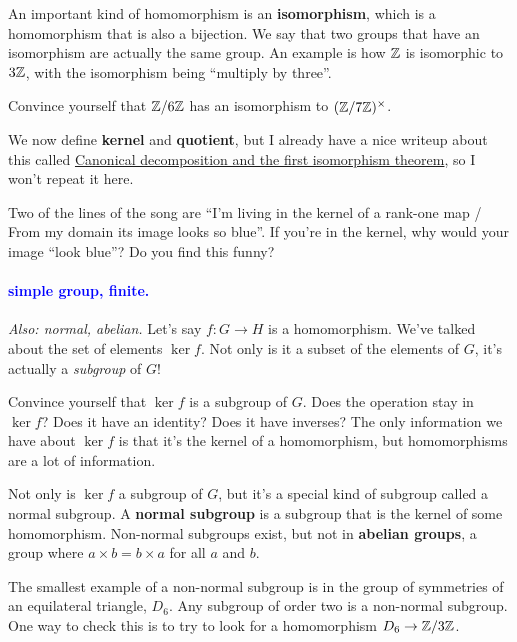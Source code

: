 \documentclass[11pt,paper=letter]{scrartcl}
\renewcommand{\bluebf}[1]{{\bfseries \color{Blue} #1}}
\renewcommand\wp[1]{\paragraph{\textcolor{Blue}{#1.}} \hspace{-1em}}
\newcommand\wl[1]{\label{w:#1}}
\newcommand\oww[1]{\textit{Also: #1.}}
\begin{document}
An important kind of homomorphism is an \textbf{isomorphism}, which is a homomorphism that is also a bijection. We say that two groups that have an isomorphism are actually the same group. An example is how $\mathbb Z$ is isomorphic to $3\mathbb Z$, with the isomorphism being ``multiply by three''.

\begin{exrboxed}
  Convince yourself that $\mathbb Z/6\mathbb Z$ has an isomorphism to $(\mathbb Z/7\mathbb Z)^\times$.
\end{exrboxed}

We now define \bluebf{kernel} and \bluebf{quotient}, but I already have a nice writeup about this called \href{https://cjquines.com/files/canonicaldecomposition.pdf}{Canonical decomposition and the first isomorphism theorem}, so I won't repeat it here.

\begin{exrboxed}
  Two of the lines of the song are ``I'm living in the kernel of a rank-one map / From my domain its image looks so blue''. If you're in the kernel, why would your image ``look blue''? Do you find this funny?
\end{exrboxed}

\wp{simple group, finite}
\wl{simple group}
\wl{finite}
\oww{normal, abelian}
Let's say $f : G \to H$ is a homomorphism. We've talked about the set of elements $\ker f$. Not only is it a subset of the elements of $G$, it's actually a \textit{subgroup} of $G$!

\begin{exrboxed}
  Convince yourself that $\ker f$ is a subgroup of $G$. Does the operation stay in $\ker f$? Does it have an identity? Does it have inverses? The only information we have about $\ker f$ is that it's the kernel of a homomorphism, but homomorphisms are a lot of information.
\end{exrboxed}

Not only is $\ker f$ a subgroup of $G$, but it's a special kind of subgroup called a normal subgroup. A \textbf{normal subgroup} is a subgroup that is the kernel of some homomorphism. Non-normal subgroups exist, but not in \textbf{abelian groups}, a group where $a \times b = b \times a$ for all $a$ and $b$.

\begin{remboxed}
  The smallest example of a non-normal subgroup is in the group of symmetries of an equilateral triangle, $D_6$. Any subgroup of order two is a non-normal subgroup. One way to check this is to try to look for a homomorphism $D_6 \to \mathbb Z/3\mathbb Z$.
\end{remboxed}
\end{document}
